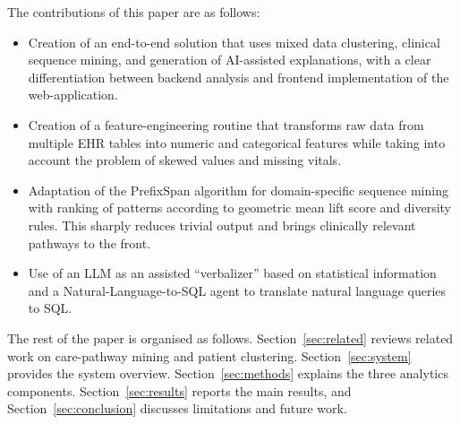 The contributions of this paper are as follows:

\begin{itemize}
  \item Creation of an end-to-end solution that uses mixed data clustering, clinical sequence mining, and generation of AI-assisted explanations, with a clear differentiation between backend analysis and frontend implementation of the web-application.
  \item Creation of a feature-engineering routine that transforms raw data from multiple EHR tables into numeric and categorical features while taking into account the problem of skewed values and missing vitals.
  \item Adaptation of the PrefixSpan algorithm for domain-specific sequence mining with ranking of patterns according to geometric mean lift score and diversity rules. This sharply reduces trivial output and brings clinically relevant pathways to the front.
  \item Use of an LLM as an assisted ``verbalizer'' based on statistical information and a Natural-Language-to-SQL agent to translate natural language queries to SQL.
\end{itemize}

The rest of the paper is organised as follows. Section~\ref{sec:related} reviews related work on care-pathway mining and patient clustering. Section~\ref{sec:system} provides the system overview. Section~\ref{sec:methods} explains the three analytics components. Section~\ref{sec:results} reports the main results, and Section~\ref{sec:conclusion} discusses limitations and future work.